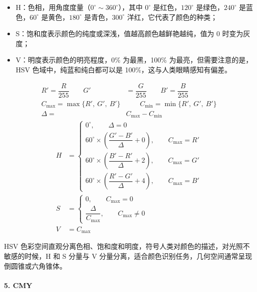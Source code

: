 \documentclass{article}
\begin{document}
\begin{itemize}
    \item H：色相，用角度度量（$0^{\circ}\sim360^{\circ}$），其中 $0^{\circ}$ 是红色，$120^{\circ}$ 是绿色，$240^{\circ}$ 是蓝色，$60^{\circ}$ 是黄色，$180^{\circ}$ 是青色，$300^{\circ}$ 洋红，它代表了颜色的种类；
    \item S：饱和度表示颜色的纯度或深浅，值越高颜色越鲜艳越纯，值为 0 时变为灰度；
    \item V：明度表示颜色的明亮程度，0\% 为最黑，100\% 为最亮，但需要注意的是，HSV 色域中，纯蓝和纯白都可以是 100\%，这与人类眼睛感知有偏差。
\end{itemize}
\begin{align*}
    R'=\dfrac{R}{255}\qquad G'&=\dfrac{G}{255}\qquad B'=\dfrac{B}{255}
    \\
    C_{\max}=\max\{R',\ G',\ B'\}&\qquad C_{\min}=\min\{R',\ G',\ B'\}
    \\
    \Delta=&C_{\max}-C_{\min}
\end{align*}
\vspace*{-2.5em}
\begin{align*}
    H&=\begin{cases}
        0^{\circ},\qquad \Delta=0
        \\[10pt]
        60^{\circ}\times\left(\dfrac{G'-B'}{\Delta}+0\right),\qquad C_{\max}=R'
        \\[10pt]
        60^{\circ}\times\left(\dfrac{B'-R'}{\Delta}+2\right),\qquad C_{\max}=G'
        \\[10pt]
        60^{\circ}\times\left(\dfrac{R'-G'}{\Delta}+4\right),\qquad C_{\max}=B'
    \end{cases}
    \\
    S&=\begin{cases}
        0,\qquad C_{\max}=0
        \\[10pt]
        \dfrac{\Delta}{C_{\max}},\qquad C_{\max}\neq0
    \end{cases}
    \\
    V&=C_{\max}
\end{align*}

HSV 色彩空间直观分离色相、饱和度和明度，符号人类对颜色的描述，对光照不敏感的时候，H 和 S 分量与 V 分量分离，适合颜色识别任务，几何空间通常呈现倒圆锥或六角锥体。

\paragraph*{5. CMY}~{}
\end{document}
